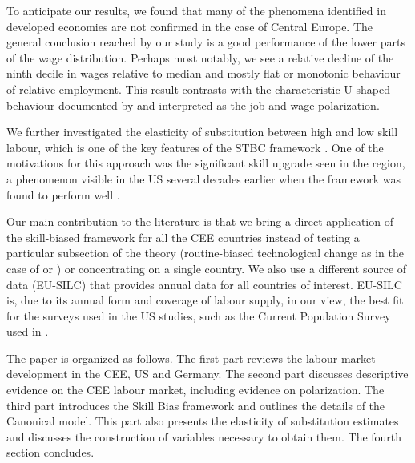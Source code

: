\documentclass[11pt]{article}
\begin{document}
To anticipate our results, we found that many of the phenomena identified in developed economies are not confirmed in the case of Central Europe. The general conclusion reached by our study is a good performance of the lower parts of the wage distribution. Perhaps most notably, we see a relative decline of the ninth decile in wages relative to median and mostly flat or monotonic behaviour of relative employment. This result contrasts with the characteristic U-shaped behaviour documented by \citet{acemoglu2012does} and interpreted as the job and wage polarization. %

We further investigated the elasticity of substitution between high and low skill labour, which is one of the key features of the STBC framework \citep{katz1992changes}. One of the motivations for this approach was the significant skill upgrade seen in the region, a phenomenon visible in the US several decades earlier when the framework was found to perform well \citep{hardy2018educational}.

Our main contribution to the literature is that we bring a direct application of the skill-biased framework for all the CEE countries instead of testing a particular subsection of the theory (routine-biased technological change as in the case of \citet{arendt2019technical} or \citet{hardy2018educational}) or concentrating on a single country. We also use a different source of data (EU-SILC) that provides annual data for all countries of interest. EU-SILC is, due to its annual form and coverage of labour supply, in our view, the best fit for the surveys used in the US studies, such as the Current Population Survey used in \citet{katz1992changes}. 

The paper is organized as follows. The first part reviews the labour market development in the CEE, US and Germany. The second part discusses descriptive evidence on the CEE labour market, including evidence on polarization. The third part introduces the Skill Bias framework and outlines the details of the Canonical model. This part also presents the elasticity of substitution estimates and discusses the construction of variables necessary to obtain them. The fourth section concludes.
\end{document}
